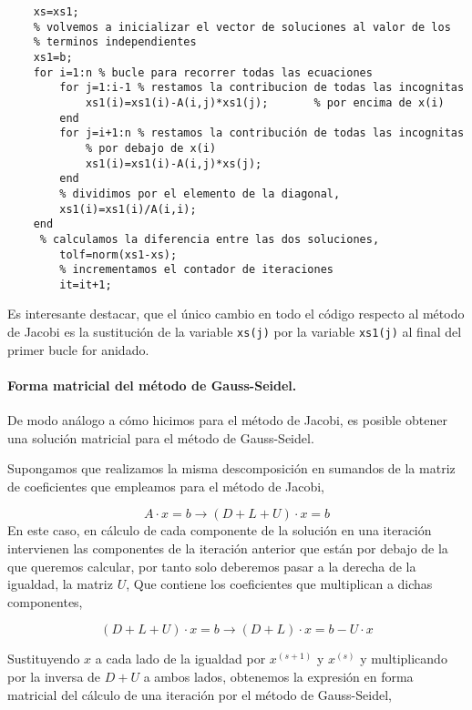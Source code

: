 \begin{lstlisting}
    xs=xs1;
    % volvemos a inicializar el vector de soluciones al valor de los
    % terminos independientes
    xs1=b; 
    for i=1:n % bucle para recorrer todas las ecuaciones
        for j=1:i-1 % restamos la contribucion de todas las incognitas
            xs1(i)=xs1(i)-A(i,j)*xs1(j);       % por encima de x(i)
        end
        for j=i+1:n % restamos la contribución de todas las incognitas
            % por debajo de x(i)
            xs1(i)=xs1(i)-A(i,j)*xs(j);
        end
        % dividimos por el elemento de la diagonal,
        xs1(i)=xs1(i)/A(i,i);
    end
     % calculamos la diferencia entre las dos soluciones,
        tolf=norm(xs1-xs);
        % incrementamos el contador de iteraciones
        it=it+1;
\end{lstlisting}

Es interesante destacar, que el único cambio en todo el código respecto al método de Jacobi es la sustitución de la variable \texttt{xs(j)} por la variable \texttt{xs1(j)} al final del primer bucle for anidado.

\paragraph{Forma matricial del método de Gauss-Seidel.}  De modo análogo a cómo hicimos para el método de Jacobi, es posible obtener una solución matricial para el método de Gauss-Seidel. 

Supongamos que realizamos la misma descomposición en sumandos de la matriz de coeficientes que empleamos para el método de Jacobi,

\begin{equation*}
A\cdot x =b \rightarrow (D+L+U)\cdot x=b
\end{equation*}  
En este caso, en cálculo de cada componente de la solución en una iteración intervienen las componentes de la iteración anterior que están por debajo de la que queremos calcular, por tanto solo deberemos pasar a la derecha de la igualdad, la matriz $U$, Que contiene los coeficientes que multiplican a dichas componentes,

\begin{equation*}
(D+L+U)\cdot x=b \rightarrow (D+L)\cdot x= b-U\cdot x
\end{equation*}

Sustituyendo $x$ a cada lado de la igualdad por $x^{(s+1)}$ y $x^{(s)}$ y multiplicando por la inversa de $D+U$ a ambos lados, obtenemos la expresión en forma matricial del cálculo de una iteración por el método de Gauss-Seidel,

